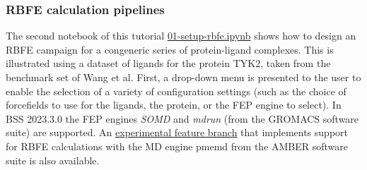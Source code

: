 \subsubsection{RBFE calculation pipelines}

The second notebook of this tutorial \href{https://github.com/OpenBioSim/biosimspace_tutorials/blob/main/04_fep/02_RBFE/01_setup_rbfe.ipynb}{01-setup-rbfe.ipynb} shows how to design an RBFE campaign for a congeneric series of protein-ligand complexes. This is illustrated using a dataset of ligands for the protein TYK2, taken from the benchmark set of Wang et al. \cite{Wang2015} 
First, a drop-down menu is presented to the user to enable the selection of a variety of configuration settings (such as the choice of forcefields to use for the ligands, the protein, or the FEP engine to select). In BSS 2023.3.0 the FEP engines \emph{SOMD} and \emph{mdrun} (from the GROMACS software suite) are supported. An \href{https://github.com/michellab/BioSimSpace/tree/feature-amber-fep}{experimental feature branch} that implements support for RBFE calculations with the MD engine pmemd from the AMBER software suite is also available. 

